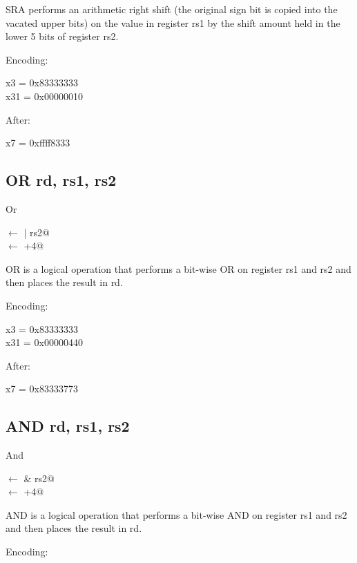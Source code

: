 SRA performs an arithmetic right shift (the original sign bit is copied 
into the vacated upper bits) on the value in register rs1 by the shift 
amount held in the lower 5 bits of 
register rs2.~\cite[p.~14,~15]{rvismv1v22:2017}

Encoding:


x3  = 0x83333333\\
x31 = 0x00000010

After:

x7 = 0xffff8333

\subsection{OR rd, rs1, rs2}

Or 

\verb@rd@ $\leftarrow$  | rs2@\\
\verb@pc@ $\leftarrow$ \verb@pc+4@

OR is a logical operation that performs a bit-wise OR on 
register rs1 and rs2 and then places the result 
in rd.~\cite[p.~14]{rvismv1v22:2017}

Encoding:


x3  = 0x83333333\\
x31 = 0x00000440

After:

x7 = 0x83333773

\subsection{AND rd, rs1, rs2}

And

\verb@rd@ $\leftarrow$  & rs2@\\
\verb@pc@ $\leftarrow$ \verb@pc+4@

AND is a logical operation that performs a bit-wise AND on 
register rs1 and rs2 and then places the result 
in rd.~\cite[p.~14]{rvismv1v22:2017}

Encoding:


